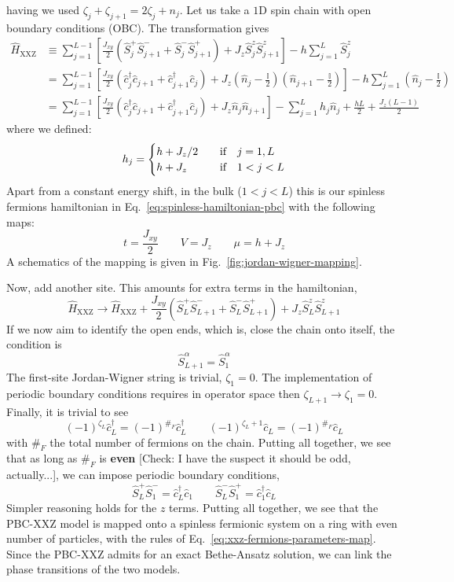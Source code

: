 having we used $\zeta_j + \zeta_{j+1} = 2 \zeta_j + n_j$.
Let us take a $1\mathrm{D}$ spin chain with open boundary conditions (OBC). The transformation gives
\[
	\begin{aligned}
		\hat H_\mathrm{XXZ} &\equiv \sum_{j=1}^{L-1} \left[
			\frac{J_{xy}}{2} \left( 
				\hat S_j^+ \hat S_{j+1}^- + \hat S_j^- \hat S_{j+1}^+
			\right) + J_z \hat S_j^z \hat S_{j+1}^z
		\right] - h \sum_{j=1}^L \hat S_j^z \\
		&= \sum_{j=1}^{L-1} \left[
			\frac{J_{xy}}{2} \left(
				\hat c_j^\dagger \hat c_{j+1} + \hat c_{j+1}^\dagger \hat c_j
			\right) + J_z \left(
				\hat n_j - \frac{\mathbb{I}}{2}
			\right) \left(
				\hat n_{j+1} - \frac{\mathbb{I}}{2}
			\right)
		\right] - h \sum_{j=1}^L \left(
			\hat n_{j} - \frac{\mathbb{I}}{2}
		\right) \\
		&= \sum_{j=1}^{L-1} \left[
			\frac{J_{xy}}{2} \left(
				\hat c_j^\dagger \hat c_{j+1} + \hat c_{j+1}^\dagger \hat c_j
			\right) + J_z \hat n_j \hat n_{j+1}
		\right] - \sum_{j=1}^L h_j \hat n_{j}
		+ \frac{hL}{2} + \frac{J_z (L-1)}{2}
	\end{aligned}
\]
where we defined:
\[
	h_j = \begin{cases}
		h + J_z/2 &\qq{if} j=1,L \\
		h + J_z &\qq{if} 1<j<L
	\end{cases}
\]
Apart from a constant energy shift, in the bulk ($1<j<L$) this is our spinless fermions hamiltonian in Eq.~\eqref{eq:spinless-hamiltonian-pbc} with the following maps:
\begin{equation}\label{eq:xxz-fermions-parameters-map}
	t = \frac{J_{xy}}{2}
	\qquad
	V = J_z
	\qquad
	\mu = h + J_z
\end{equation}
A schematics of the mapping is given in Fig.~\ref{fig:jordan-wigner-mapping}.

Now, add another site. This amounts for extra terms in the hamiltonian,
\[
	\hat H_\mathrm{XXZ} \to \hat H_\mathrm{XXZ} + \frac{J_{xy}}{2} \left( 
		\hat S_L^+ \hat S_{L+1}^- + \hat S_L^- \hat S_{L+1}^+
	\right) + J_z \hat S_L^z \hat S_{L+1}^z
\]
If we now aim to identify the open ends, which is, close the chain onto itself, the condition is
\[
	\hat S_{L+1}^\alpha = \hat S_1^\alpha
\]
The first-site Jordan-Wigner string is trivial, $\zeta_1 = 0$. The implementation of periodic boundary conditions requires in operator space then $\zeta_{L+1} \to \zeta_1 = 0$. Finally, it is trivial to see
\[
	(-1)^{\zeta_L} \hat c_L^\dagger = (-1)^{\#_F} \hat c_L^\dagger
	\qquad
	(-1)^{\zeta_L+1} \hat c_L = (-1)^{\#_F} \hat c_L
\]
with $\#_F$ the total number of fermions on the chain. Putting all together, we see that as long as $\#_F$ is \textbf{even} {\color{tabred}[Check: I have the suspect it should be odd, actually...]}, we can impose periodic boundary conditions,
\[
	\hat S_L^+ \hat S_1^- = \hat c_L^\dagger \hat c_1
	\qquad
	\hat S_L^- \hat S_1^+ = \hat c_1^\dagger \hat c_L
\]
Simpler reasoning holds for the $z$ terms. Putting all together, we see that the PBC-$\mathrm{XXZ}$ model is mapped onto a spinless fermionic system on a ring with even number of particles, with the rules of Eq.~\eqref{eq:xxz-fermions-parameters-map}. Since the PBC-$\mathrm{XXZ}$ admits for an exact Bethe-Ansatz solution, we can link the phase transitions of the two models.

